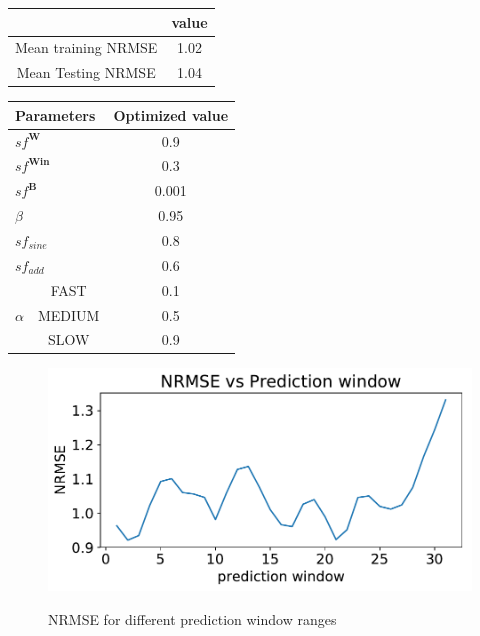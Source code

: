 \begin{center}
		\label{table:error}
		
 \begin{tabular}{|c|c|} \hline

     & value \\ \hline
	 Mean training NRMSE & 1.02\\ \hline
	 Mean Testing NRMSE & 1.04 \\ \hline

\end{tabular}
\end{center}
\begin{center}
\begin{tabular}{|c|c|c|} \hline
	 \multicolumn{2}{|l|}{ Parameters }& Optimized value\\ \hline
	 \multicolumn{2}{|l|}{ $sf^{\mathbf{W}}$}& 0.9\\ \hline
	 \multicolumn{2}{|l|}{$sf^{\mathbf{Win}}$}& 0.3 \\ \hline
	 \multicolumn{2}{|l|}{$sf^{\mathbf{B}}$}& 0.001\\ \hline
	 \multicolumn{2}{|l|}{$\beta$}& 0.95\\ \hline
	 \multicolumn{2}{|l|}{$sf_{sine}$} & 0.8\\ \hline
	 \multicolumn{2}{|l|}{ $sf_{add}$} &  0.6\\ \hline
	 \multirow{3}{*}{$\alpha$} & FAST & 0.1\\ \cline{2-3}
	                   & MEDIUM &0.5\\ \cline{2-3}
					   & SLOW &  0.9 \\\hline	
\end{tabular}
 \label{table:optimized} 
\end{center}

	
  \begin{figure}[h]
     \centering
     \includegraphics[width=\textwidth]{./results/images/nrmsevspwrec}
	 \label{fig:nrmsevspredicted}
      \caption{NRMSE for different prediction window ranges}\label{fig:nrmsevspw}
  \end{figure}
 
